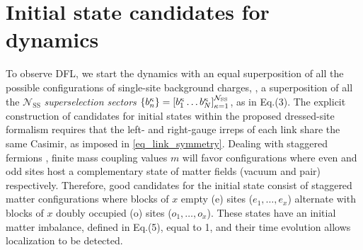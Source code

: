 \documentclass[aps,prl,reprint,twocolumn,superscriptaddress,floatfix,nofootinbib]{revtex4-2}
\begin{document}
\section{Initial state candidates for dynamics}\label{sec_intial_states}
To observe DFL, we start the dynamics with an equal superposition of all the possible configurations of single-site background charges, \idest{}, a superposition of all the $\mathcal{N}_{\mathrm{SS}}$ \emph{superselection sectors} $\qty{b^{\kappa}_{n}}=\qty[b^{\kappa}_{1}\dots b^{\kappa}_{N}]_{\kappa=1}^{\mathcal{N}_{\mathrm{SS}}}$, as in Eq.(3).
The explicit construction of candidates for initial states within the proposed dressed-site formalism requires that the left- and right-gauge irreps of each link share the same Casimir, as imposed in \cref{eq_link_symmetry}.
Dealing with staggered fermions \cite{Susskind1977LatticeFermions}, finite mass coupling values $m$ will favor configurations where even and odd sites host a complementary state of matter fields (vacuum and pair) respectively.
Therefore, good candidates for the initial state consist of staggered matter configurations where blocks of \(x\) empty (e) sites ($e_{1},\!\dots, e_{x}$) alternate with blocks of \(x\) doubly occupied (o) sites ($o_{1},\dots, o_{x}$).
These states have an initial matter imbalance, defined in Eq.(5), equal to 1, and their time evolution allows localization to be detected.
\end{document}

